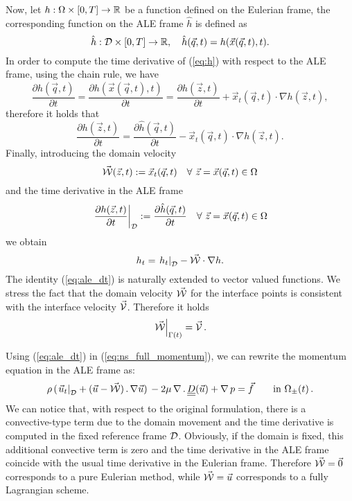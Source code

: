Now, let $h:\Omega\times [0,T]\to \mathbb R$ be a function defined on the Eulerian
frame, the corresponding function on the ALE frame $\hat h$ is defined as
\begin{equation}\label{eq:h}
\hat h:\mathcal D\times [0,T]\to \mathbb R,\quad \hat h(\vec q,t)=h(\vec x(\vec q,t),t).
\end{equation}
In order to compute the time derivative of (\ref{eq:h}) with respect to the ALE
frame, using the chain rule, we have
\begin{equation}
\frac{\partial\hat h(\vec q,t)}{\partial t}=\frac{\partial h(\vec x(\vec
q,t),t)}{\partial t}=\frac{\partial h(\vec z,t)}{\partial t}+\vec x_t(\vec q,t)
\cdot \nabla h(\vec z,t),
\end{equation}
therefore it holds that
\begin{equation}
\frac{\partial h(\vec z,t)}{\partial t} =
\frac{\partial\hat h(\vec q,t)}{\partial t}-
\vec x_t(\vec q,t) \cdot \nabla h(\vec z,t).
\end{equation}
Finally, introducing the domain velocity
\begin{equation} \label{eq:W}
\vec{\mathcal W}(\vec z, t) := \vec x_t(\vec q, t) \quad \forall\ \vec z = \vec x(\vec q,t)
\in \Omega
\end{equation}
and the time derivative in the ALE frame
\begin{equation} \label{eq:ale_derivative}
\left.\frac{\partial h(\vec z,t)}{\partial t}\right|_{\mathcal D}:=
\frac{\partial\hat h(\vec q,t)}{\partial t} \quad
\forall\ \vec z = \vec x(\vec q,t) \in \Omega
\end{equation}
we obtain
\begin{equation}\label{eq:ale_dt}
h_t =\left.h_t\right|_{\mathcal D} -\vec{\mathcal{W}} \cdot \nabla h.
\end{equation}
The identity (\ref{eq:ale_dt}) is naturally extended to vector valued functions.
We stress the fact that the domain velocity $\vec{\mathcal W}$ for the interface points is
consistent with the interface velocity $\vec{\mathcal{V}}$. Therefore it holds
\begin{equation}
\left.\vec{\mathcal W} \right|_{\Gamma(t)}=\vec{\mathcal{V}}\,.
\end{equation}

Using (\ref{eq:ale_dt}) in (\ref{eq:ns_full_momentum}), we can rewrite the
momentum equation in the ALE frame as:
\begin{align}
\rho\,(\left.\vec u_t\right|_{\D} +(\vec u - \W)\,.\, \nabla \vec u)\,
-2 \mu\,\nabla\,.\, \mat D(\vec u)+ \nabla\,p & = \vec f
\quad &&\mbox{in } \Omega_\pm(t)\,. \label{eq:ns_full_momentum_ale} \\
\end{align}
We can notice that, with respect to the original formulation, there is a
convective-type term due to the domain movement and the time derivative is
computed in the fixed reference frame $\mathcal D$. Obviously, if the domain is fixed,
this additional convective term is zero and the time derivative in the ALE
frame coincide with the usual time derivative in the Eulerian frame. Therefore
$\vec{\mathcal W}=\vec 0$ corresponds to a pure Eulerian method, while $\vec{\mathcal W}=\vec u$ corresponds
to a fully Lagrangian scheme.

